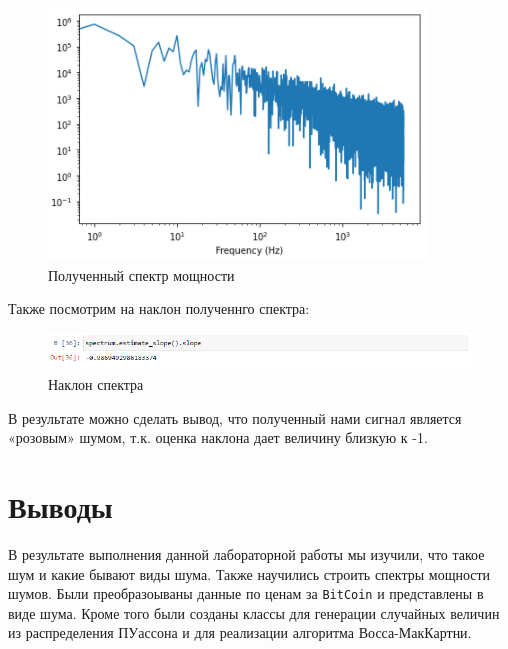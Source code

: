 \documentclass[a4paper]{article}
\begin{document}
            \begin{figure}[H]
                \centering
                \includegraphics{ex_5_wave_spectr.png}
                \caption{Полученный спектр мощности}
                \label{fig:ex_5_wave_spectr}
            \end{figure}
            
            Также посмотрим на наклон полученнго спектра:
            
            \begin{figure}[H]
                \centering
                \includegraphics[width=\textwidth]{ex_5_wave_estimate_slope.png}
                \caption{Наклон спектра}
                \label{fig:ex_5_wave_estimate_slope}
            \end{figure}
            
            В результате можно сделать вывод, что полученный нами сигнал является «розовым» шумом, т.к. оценка наклона дает величину близкую к -1.
            
    \newpage
        \section{Выводы}
            В результате выполнения данной лабораторной работы мы изучили, что такое шум и какие бывают виды шума. Также научились строить спектры мощности шумов. Были преобразоываны данные по ценам за \texttt{BitCoin} и представлены в виде шума. Кроме того были созданы классы для генерации случайных величин из распределения ПУассона и для реализации алгоритма Восса-МакКартни.
            
\end{document}

